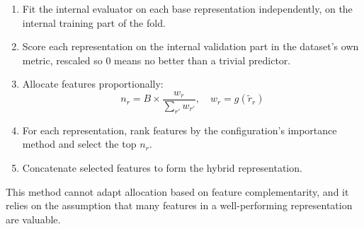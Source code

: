 \begin{enumerate}
    \item Fit the internal evaluator on each base representation independently, on the internal training part of the fold.
    \item Score each representation on the internal validation part in the dataset's own metric, rescaled so 0 means no better than a trivial predictor.
    \item Allocate features proportionally:
    \[
    n_r = B \times \frac{w_r}{\sum_{r'} w_{r'}}, \quad w_r = g(\tilde r_r)
    \]
    \item For each representation, rank features by the configuration's importance method and select the top $n_r$.
    \item Concatenate selected features to form the hybrid representation.
\end{enumerate}

This method cannot adapt allocation based on feature complementarity, and it relies on the assumption that many features in a well-performing representation are valuable.


